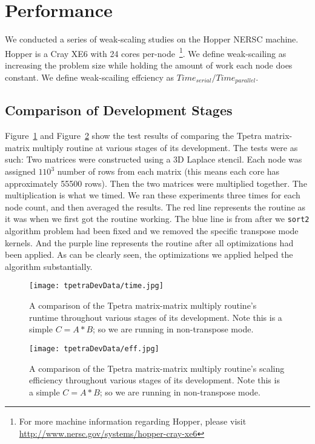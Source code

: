 \documentclass{article}
\begin{document}
\section{Performance}
We conducted a series of weak-scaling studies on the Hopper NERSC machine. Hopper is a Cray XE6 with 24 cores
per-node~\footnote{For more machine information regarding Hopper, please visit \url{http://www.nersc.gov/systems/hopper-cray-xe6}}.
We define weak-scailing as increasing the problem size while holding the amount of work each node does constant. We define
weak-scailing effciency as $Time_{serial}/Time_{parallel}$.

\subsection{Comparison of Development Stages}
Figure~\ref{tpetracomptime} and Figure~\ref{tpetracompeff} show the test results of comparing the Tpetra matrix-matrix multiply 
routine at various stages of its 
development.  The tests were as such: Two matrices were constructed using a 3D Laplace stencil. Each node was assigned 
$110^3$ number of rows from each matrix (this means each core has approximately 55500 rows). 
Then the two matrices were multiplied together. The multiplication is what 
we timed. We ran these experiments three times for each node count, and then averaged the results.
The red line represents the routine as it was when we first got the routine working. The blue line is from after 
we \verb!sort2! algorithm problem had been fixed and we removed the specific transpose mode kernels. 
And the purple line represents the routine after all optimizations had been applied.
As can be clearly seen, the optimizations we applied helped the algorithm substantially.

\begin{figure}
\texttt{[image: tpetraDevData/time.jpg]}
\caption[Time Comparison]{A comparison of the Tpetra matrix-matrix multiply routine's runtime 
throughout various stages of its development. Note this is a simple $C=A*B$; so we are running in non-transpose mode.}
\label{tpetracomptime}
\end{figure}

\begin{figure}
\texttt{[image: tpetraDevData/eff.jpg]}
\caption[Efficiency Comparison]{A comparison of the Tpetra matrix-matrix multiply routine's scaling efficiency
throughout various stages of its development. Note this is a simple $C=A*B$; so we are running in non-transpose mode.}
\label{tpetracompeff}
\end{figure}
\end{document}
